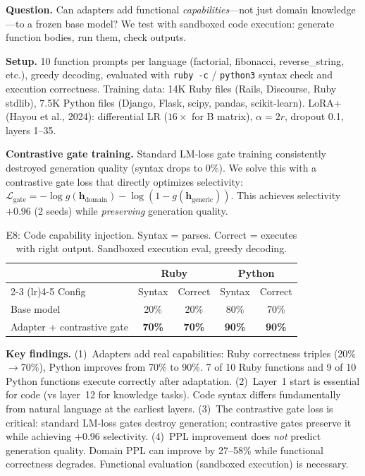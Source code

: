\documentclass{article}
\begin{document}
\textbf{Question.} Can adapters add functional \emph{capabilities}---not
just domain knowledge---to a frozen base model? We test with sandboxed
code execution: generate function bodies, run them, check outputs.

\textbf{Setup.} 10 function prompts per language (factorial, fibonacci,
reverse\_string, etc.), greedy decoding, evaluated with \texttt{ruby~-c} /
\texttt{python3} syntax check and execution correctness. Training data:
14K Ruby files (Rails, Discourse, Ruby stdlib), 7.5K Python files
(Django, Flask, scipy, pandas, scikit-learn). LoRA+ (Hayou et al.,
2024): differential LR ($16\times$ for B matrix), $\alpha = 2r$,
dropout 0.1, layers 1--35.

\textbf{Contrastive gate training.} Standard LM-loss gate training
consistently destroyed generation quality (syntax drops to 0\%).
We solve this with a contrastive gate loss that directly optimizes
selectivity: $\mathcal{L}_\text{gate} = -\log g(\mathbf{h}_\text{domain})
- \log(1 - g(\mathbf{h}_\text{generic}))$. This achieves selectivity
$+0.96$ (2 seeds) while \emph{preserving} generation quality.

\begin{table}[h]
\centering
\caption{E8: Code capability injection. Syntax = parses. Correct = executes
with right output. Sandboxed execution eval, greedy decoding.}
\label{tab:e8}
\begin{tabular}{@{}lcccc@{}}
\toprule
 & \multicolumn{2}{c}{Ruby} & \multicolumn{2}{c}{Python} \\
\cmidrule(lr){2-3} \cmidrule(lr){4-5}
Config & Syntax & Correct & Syntax & Correct \\
\midrule
Base model & 20\% & 20\% & 80\% & 70\% \\
Adapter + contrastive gate & \textbf{70\%} & \textbf{70\%} & \textbf{90\%} & \textbf{90\%} \\
\bottomrule
\end{tabular}
\end{table}

\textbf{Key findings.}
(1)~Adapters add real capabilities: Ruby correctness triples (20\%$\to$70\%),
Python improves from 70\% to 90\%. 7 of 10 Ruby functions and 9 of 10
Python functions execute correctly after adaptation.
(2)~Layer~1 start is essential for code (vs layer~12 for knowledge tasks).
Code syntax differs fundamentally from natural language at the earliest
layers.
(3)~The contrastive gate loss is critical: standard LM-loss gates destroy
generation; contrastive gates preserve it while achieving $+0.96$
selectivity.
(4)~PPL improvement does \emph{not} predict generation quality. Domain PPL
can improve by 27--58\% while functional correctness degrades. Functional
evaluation (sandboxed execution) is necessary.
\end{document}
